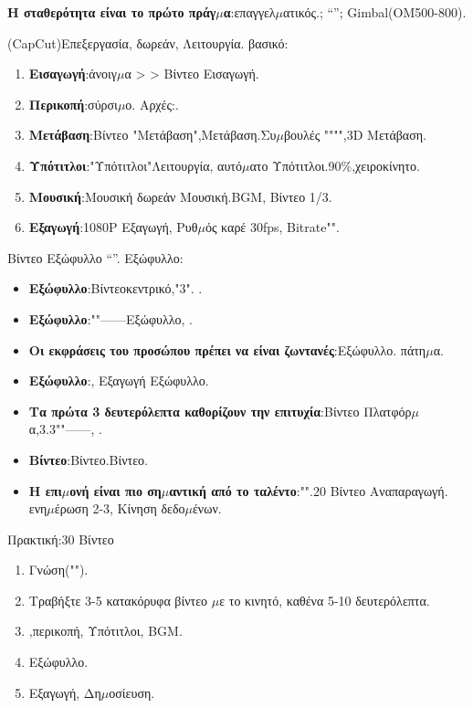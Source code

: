 \textbf{Η σταθερότητα είναι το πρώτο πράγ$\mu$α}:επαγγελ$\mu$ατικός.; “”; Gimbal(OM500-800).


(CapCut)Επεξεργασία, δωρεάν, Λειτουργία. βασικό:

\begin{enumerate}
  \item \textbf{Εισαγωγή}:άνοιγ$\mu$α > > Βίντεο Εισαγωγή.
  \item \textbf{Περικοπή}:σύρσι$\mu$ο. Αρχές:.
  \item \textbf{Μετάβαση}:Βίντεο "Μετάβαση",Μετάβαση.Συ$\mu$βουλές """",3D Μετάβαση.
  \item \textbf{Υπότιτλοι}:"Υπότιτλοι"Λειτουργία, αυτό$\mu$ατο Υπότιτλοι.90\%,χειροκίνητο.
  \item \textbf{Μουσική}:Μουσική δωρεάν Μουσική.BGM, Βίντεο 1/3.
  \item \textbf{Εξαγωγή}:1080P Εξαγωγή, Ρυθ$\mu$ός καρέ 30fps, Bitrate"".
\end{enumerate}


Βίντεο Εξώφυλλο “”. Εξώφυλλο:

\begin{itemize}
  \item \textbf{Εξώφυλλο}:Βίντεοκεντρικό,"3". .
  \item \textbf{Εξώφυλλο}:""——Εξώφυλλο, .
  \item \textbf{Οι εκφράσεις του προσώπου πρέπει να είναι ζωντανές}:Εξώφυλλο. πάτη$\mu$α.
  \item \textbf{Εξώφυλλο}:, Εξαγωγή Εξώφυλλο.
\end{itemize}


\begin{itemize}
  \item \textbf{Τα πρώτα 3 δευτερόλεπτα καθορίζουν την επιτυχία}:Βίντεο Πλατφόρ$\mu$α,3.3""——, .
  \item \textbf{Βίντεο}:Βίντεο.Βίντεο.
  \item \textbf{Η επι$\mu$ονή είναι πιο ση$\mu$αντική από το ταλέντο}:"".20 Βίντεο Αναπαραγωγή. ενη$\mu$έρωση 2-3, Κίνηση δεδο$\mu$ένων.
\end{itemize}

\begin{tcbpractice}{Πρακτική:30 Βίντεο}
\begin{enumerate}
  \item Γνώση("").
  \item Τραβήξτε 3-5 κατακόρυφα βίντεο $\mu$ε το κινητό, καθένα 5-10 δευτερόλεπτα.
  \item ,περικοπή, Υπότιτλοι, BGM.
  \item Εξώφυλλο.
  \item Εξαγωγή, Δη$\mu$οσίευση.
\end{enumerate}

\end{tcbpractice}

